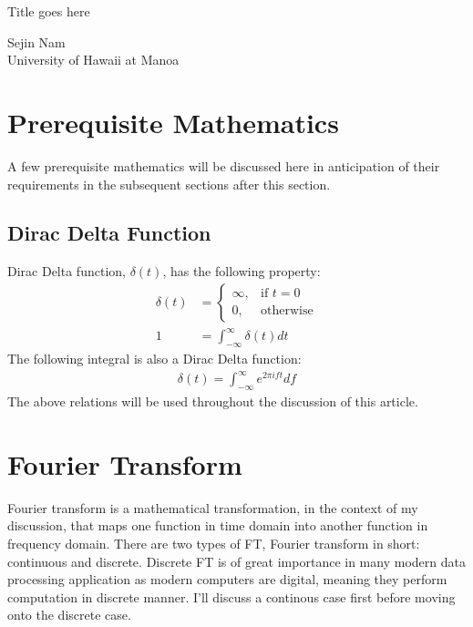\documentclass[letterpaper, 11pt]{article}
\newcommand{\fint}{\int_{-\infty}^{\infty}}
\numberwithin{equation}{section}
\begin{document}
\begin{titlepage}
	\begin{center}
		\Huge Title goes here \vfill 
	\end{center}

	\begin{flushright}
		Sejin Nam\\
		University of Hawaii at Manoa
	\end{flushright}
\end{titlepage}

\tableofcontents
\clearpage

\section{Prerequisite Mathematics}
A few prerequisite mathematics will be discussed here in anticipation of their requirements in the subsequent sections after this section. 
\subsection{Dirac Delta Function}
Dirac Delta function, \(\delta (t)\), has the following property:
\begin{align}
	\delta (t)	&=\begin{cases}
		\infty, & \text{if } t = 0 \\
		0,	& \text{otherwise}
	\end{cases}\\
		1	&= \fint \delta (t) dt
\end{align}
The following integral is also a Dirac Delta function:
\begin{align}
	\delta (t) = \fint e^{2\pi ift} df\label{eq:1}
\end{align}
The above relations will be used throughout the discussion of this article.
\section{Fourier Transform}
Fourier transform is a mathematical transformation, in the context of my discussion, that maps one function in time domain into another function in frequency domain. There are two types of FT, Fourier transform in short: continuous and discrete. Discrete FT is of great importance in many modern data processing application as modern computers are digital, meaning they perform computation in discrete manner. I'll discuss a continous case first before moving onto the discrete case.
\end{document}
